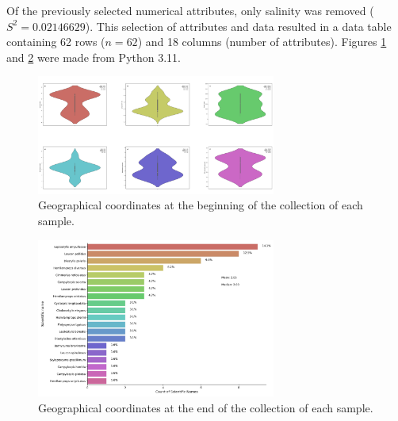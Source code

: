 Of the previously selected numerical attributes, only salinity was removed (\( S^2 = 0.02146629 \)). This selection of attributes and data resulted in a data table containing 62 rows (\( n=62 \)) and 18 columns (number of attributes). Figures \ref{fig:fig1} and \ref{fig:fig2} were made from Python 3.11.

\begin{figure}[]
    \centering
    \includegraphics[width=0.7\textwidth]{figure1.jpg}
    \caption{Geographical coordinates at the beginning of the collection of each sample. \label{fig:fig1}}
\end{figure}

\begin{figure}[]
    \centering
    \includegraphics[width=0.7\textwidth]{figure2.jpg}
    \caption{Geographical coordinates at the end of the collection of each sample. \label{fig:fig2}}
\end{figure}

